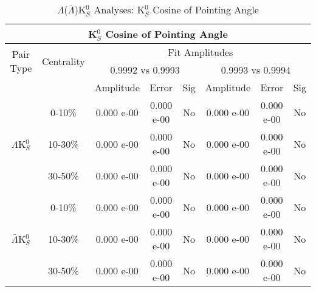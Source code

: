 \documentclass[../AnalysisNoteJBuxton.tex]{subfiles}
\begin{document}
\begin{table}
 \centering
 \begin{tabular}{|c|c|c|c|c||c|c|c|}
  \multicolumn{8}{c}{K$^{0}_{S}$ Cosine of Pointing Angle} \\
  \hline
  \multirow{2}{*}{Pair Type} & \multirow{2}{*}{Centrality} & \multicolumn{6}{c|}{Fit Amplitudes} \\
  \cline{3-8}
   & & \multicolumn{3}{c||}{0.9992 vs 0.9993} & \multicolumn{3}{c|}{0.9993 vs 0.9994} \\
  \hline
   & & Amplitude & Error & Sig & Amplitude & Error & Sig \\
  \hline  
  \multirow{3}{*}{$\Lambda$K$^{0}_{S}$}  
   &  0-10\% & 0.000 e-00 & 0.000 e-00 & No & 0.000 e-00 & 0.000 e-00 & No \\
   & 10-30\% & 0.000 e-00 & 0.000 e-00 & No & 0.000 e-00 & 0.000 e-00 & No \\
   & 30-50\% & 0.000 e-00 & 0.000 e-00 & No & 0.000 e-00 & 0.000 e-00 & No \\
  \hline  
  \multirow{3}{*}{$\bar{\Lambda}$K$^{0}_{S}$}  
   &  0-10\% & 0.000 e-00 & 0.000 e-00 & No & 0.000 e-00 & 0.000 e-00 & No \\
   & 10-30\% & 0.000 e-00 & 0.000 e-00 & No & 0.000 e-00 & 0.000 e-00 & No \\
   & 30-50\% & 0.000 e-00 & 0.000 e-00 & No & 0.000 e-00 & 0.000 e-00 & No \\
  \hline
 \end{tabular}
 \caption{$\Lambda$($\bar{\Lambda}$)K$^{0}_{S}$ Analyses: K$^{0}_{S}$ Cosine of Pointing Angle}
 \label{tab:K0CosPointingAngleLamK0}
\end{table}
\end{document}
